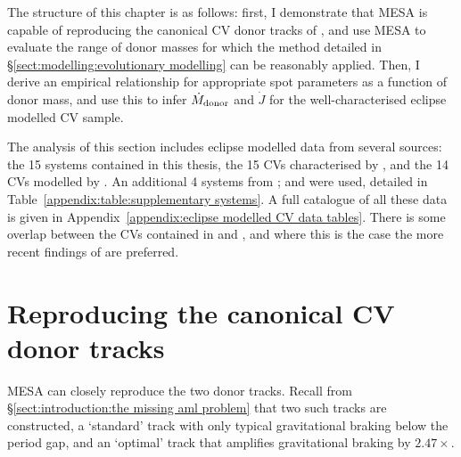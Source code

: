 
\label{chpt:Mass loss and Angular momentum loss in short period CVs} %

The structure of this chapter is as follows: first, I demonstrate that MESA is capable of reproducing the canonical CV donor tracks of \citet{knigge11}, and use MESA to evaluate the range of donor masses for which the method detailed in \S\ref{sect:modelling:evolutionary modelling} can be reasonably applied.
Then, I derive an empirical relationship for appropriate spot parameters as a function of donor mass, and use this to infer $\dot M_{\rm donor}$ and $\dot J$ for the well-characterised eclipse modelled CV sample.

The analysis of this section includes eclipse modelled data from several sources: the 15 systems contained in this thesis, the 15 CVs characterised by \citet{McAllister2019}, and the 14 CVs modelled by \citet{Savoury2011}. An additional 4 systems from \citet{mcallister2015,mcallister2017, mcallister2017b}; and \citet{copperwheat2010} were used, detailed in Table~\ref{appendix:table:supplementary systems}. A full catalogue of all these data is given in Appendix~\ref{appendix:eclipse modelled CV data tables}.
There is some overlap between the CVs contained in \citet{McAllister2019} and \citet{Savoury2011}, and where this is the case the more recent findings of \citet{McAllister2019} are preferred.


\section{Reproducing the canonical CV donor tracks}
\label{sect:results:reproducing K11 tracks}

MESA can closely reproduce the two \citet{knigge11} donor tracks. Recall from \S\ref{sect:introduction:the missing aml problem} that two such tracks are constructed, a `standard' track with only typical gravitational braking below the period gap, and an `optimal' track that amplifies gravitational braking by $2.47\times$.


